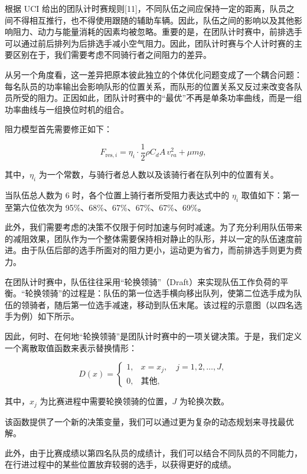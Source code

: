 \documentclass[11pt,a4paper]{ctexart}
\begin{document}
根据 UCI 给出的团队计时赛规则[11]，不同队伍之间应保持一定的距离，队员之间不得相互推行，也不得使用跟随的辅助车辆。因此，队伍之间的影响以及其他影响阻力、动力与能量消耗的因素均被忽略。重要的是，在团队计时赛中，前排选手可以通过前后排列为后排选手减小空气阻力。因此，团队计时赛与个人计时赛的主要区别在于，我们需要考虑不同骑行者之间阻力的差异。

从另一个角度看，这一差异把原本彼此独立的个体优化问题变成了一个耦合问题：每名队员的功率输出会影响队形的位置关系，而队形的位置关系又反过来改变各队员所受的阻力。正因如此，团队计时赛中的“最优”不再是单条功率曲线，而是一组功率曲线与一组换位时机的组合。

阻力模型首先需要修正如下：

\begin{equation}
F_{\mathrm{res},i} = \eta_i \cdot \frac{1}{2}\rho C_d A\, v_{ra}^2 + \mu m g ,
\end{equation}

其中，$\eta_i$ 为一个常数，与骑行者总人数以及该骑行者在队列中的位置有关。

当队伍总人数为 6 时，各个位置上骑行者所受阻力表达式中的 $\eta_i$ 取值如下：第一至第六位依次为 95\%、68\%、67\%、67\%、67\%、69\%。

此外，我们需要考虑的决策不仅限于何时加速与何时减速。为了充分利用队伍带来的减阻效果，团队作为一个整体需要保持相对静止的队形，并以一定的队伍速度前进。由于队伍后部的选手所面对的阻力更小，运动更为省力，而前排选手则更为费力。

在团队计时赛中，队伍往往采用“轮换领骑”（Draft）来实现队伍工作负荷的平衡。“轮换领骑”的过程是：队伍的第一位选手横向移出队列，使第二位选手成为队伍的领骑者，随后第一位选手减速，移动到队伍末尾。该过程的示意图（以四名选手为例）如下所示。

因此，何时、在何地“轮换领骑”是团队计时赛中的一项关键决策。于是，我们定义一个离散取值函数来表示替换情形：

\begin{equation}
D(x) = \begin{cases} 1, & x = x_j, \quad j = 1,2,\dots,J, \\[2pt] 0, & \mbox{其他}, \end{cases}
\end{equation}

其中，$x_j$ 为比赛进程中需要轮换领骑的位置，$J$ 为轮换次数。

该函数提供了一个新的决策变量，我们可以通过更为复杂的动态规划来寻找最优解。

此外，由于比赛成绩以第四名队员的成绩计，我们可以结合不同队员的不同能力，在行进过程中的某些位置放弃较弱的选手，以获得更好的成绩。
\end{document}
